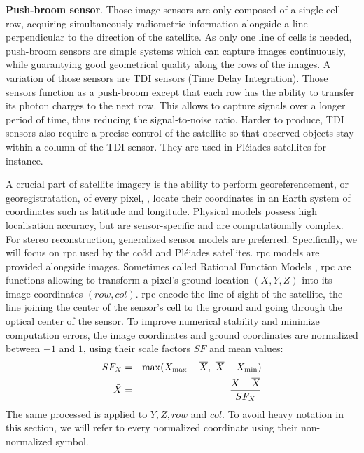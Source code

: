\textbf{Push-broom sensor}. Those image sensors are only composed of a single cell row, acquiring simultaneously radiometric information alongside a line perpendicular to the direction of the satellite. As only one line of cells is needed, push-broom sensors are simple systems which can capture images continuously, while guarantying good geometrical quality along the rows of the images. A variation of those sensors are TDI sensors (Time Delay Integration). Those sensors function as a push-broom except that each row has the ability to transfer its photon charges to the next row. This allows to capture signals over a longer period of time,  thus reducing the signal-to-noise ratio. Harder to produce, TDI sensors also require a precise control of the satellite so that observed objects stay within a column of the TDI sensor. They are used in Pléiades satellites for instance.

A crucial part of satellite imagery is the ability to perform georeferencement, or georegistratation, of every pixel, \ie, locate their coordinates in an Earth system of coordinates such as latitude and longitude. Physical models possess high localisation accuracy, but are sensor-specific and are computationally complex. For stereo reconstruction,  generalized sensor models are preferred. Specifically, we will focus on \acrfull{rpc} \cite{grodecki_ikonos_2001} used by the \acrshort{co3d} and Pléiades satellites. \acrshort{rpc} models are provided alongside images. Sometimes called Rational Function Models \cite{tao_comprehensive_2001}, \acrshort{rpc} are functions allowing to transform a pixel's ground location $(X,Y,Z)$ into its image coordinates $(row, col)$. \acrshort{rpc} encode the line of sight of the satellite, \ie the line joining the center of the sensor's cell to the ground and going through the optical center of the sensor. To improve numerical stability and minimize computation errors, the image coordinates and ground coordinates are normalized between $-1$ and $1$, using their scale factors $SF$ and mean values:
\begin{eqnarray*}
    SF_X &=& \max(X_\mathrm{max}-\overline{X},~\overline{X}-X_\mathrm{min})\\
    \Tilde{X}&=&\frac{X-\overline{X}}{SF_X}
\end{eqnarray*}
The same processed is applied to $Y,Z,row$ and $col$. To avoid heavy notation in this section, we will refer to every normalized coordinate using their non-normalized symbol.

